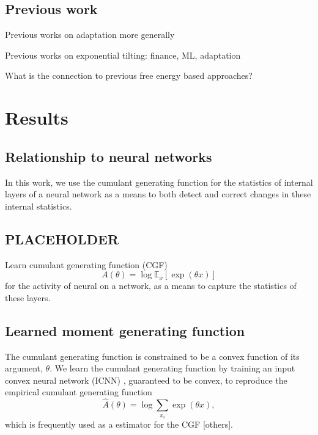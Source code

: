 \documentclass[10pt]{article}      %
\begin{document}
\subsection{Previous work}

Previous works on adaptation more generally

Previous works on exponential tilting: finance, ML, adaptation 


What is the connection to previous free energy based approaches?



\section{Results}


\subsection{Relationship to neural networks}

In this work, we use the cumulant generating function for the statistics of internal layers of a neural network as a means to both detect and correct changes in these internal statistics.



\subsection{PLACEHOLDER}



Learn cumulant generating function (CGF)
\begin{equation}
  A(\theta) = \log \mathbb{E}_x[\exp(\theta x)]
\end{equation}
for the activity of neural on a network, as a means to capture the statistics of these layers.


\subsection{Learned moment generating function}

The cumulant generating function is constrained to be a convex function of its argument, $\theta$.
We learn the cumulant generating function by training an input convex neural network (ICNN) \cite{amos_input_2017}, guaranteed to be convex, to reproduce the empirical cumulant generating function
\begin{equation}
  \hat A(\theta) = \log \sum_{x_i} \exp(\theta x),
\end{equation}
which is frequently used as a estimator for the CGF \cite{duffield_entropy_1995} [others]. 
\end{document}
